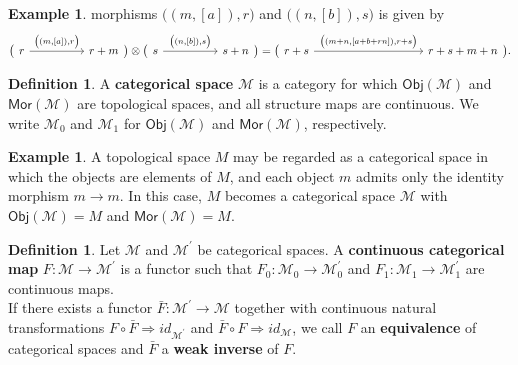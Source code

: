 \documentclass{article}
\theoremstyle{plain}
\theoremstyle{definition}
\newtheorem{defn}[thm]{Definition}
\newtheorem{exa}[thm]{Example}
\begin{document}
\begin{exa}
morphisms $\bigl((m,[a]),r\bigr)$ and $\bigl((n,[b]),s\bigr)$ is given by
\begin{equation*}
\bigl(\begin{tikzcd}
r \arrow[rr,"{\bigl((m,[a]),r\bigr)}"] & & r + m
\end{tikzcd}\bigr) \otimes
\bigl(\begin{tikzcd}
s \arrow[rr,"{\bigl((n,[b]),s\bigr)}"] & & s + n
\end{tikzcd}\bigr) =
\bigl(\begin{tikzcd}
r + s \arrow[rrrr,"{\bigl((m+n,[a+b+rn]),r+s\bigr)}"] & & & & r + s + m + n
\end{tikzcd}\bigr).
\end{equation*}
\end{exa}
\begin{defn}\cite{MR116360}\cite[Definition 1.4 on page 569]{MR2805195}
A \textbf{categorical space} $\mathcal{M}$ is a category for which $\mathsf{Obj}(\mathcal{M})$ and $\mathsf{Mor}(\mathcal{M})$ are topological spaces, and all structure maps are continuous. We write $\mathcal{M}_0$ and $\mathcal{M}_1$ for $\mathsf{Obj}(\mathcal{M})$ and $\mathsf{Mor}(\mathcal{M})$, respectively.
\end{defn}
\begin{exa}
A topological space $M$ may be regarded as a categorical space in which the objects are elements of $M$, and each object $m$ admits only the identity morphism $m \longrightarrow m$. In this case, $M$ becomes a categorical space $\mathcal{M}$ with $\mathsf{Obj}(\mathcal{M}) = M$ and $\mathsf{Mor}(\mathcal{M}) = M$.
\end{exa}
\begin{defn}\cite{MR116360}\cite[Definition 1.4 on page 569]{MR2805195}
Let $\mathcal{M}$ and $\mathcal{M}^\prime$ be categorical spaces. A \textbf{continuous categorical map} $F:\mathcal{M} \longrightarrow \mathcal{M}^\prime$ is a functor such that $F_0:\mathcal{M}_0 \longrightarrow \mathcal{M}^\prime_0$ and $F_1:\mathcal{M}_1 \longrightarrow \mathcal{M}^\prime_1$ are continuous maps. \\
If there exists a functor $\bar{F}:\mathcal{M}^\prime \longrightarrow \mathcal{M}$ together with continuous natural transformations $F \circ \bar{F} \Longrightarrow id_{\mathcal{M}^\prime}$ and $\bar{F} \circ F \Longrightarrow id_{\mathcal{M}}$, we call $F$ an \textbf{equivalence} of categorical spaces and $\bar{F}$ a \textbf{weak inverse} of $F$.
\end{defn}
\end{document}
